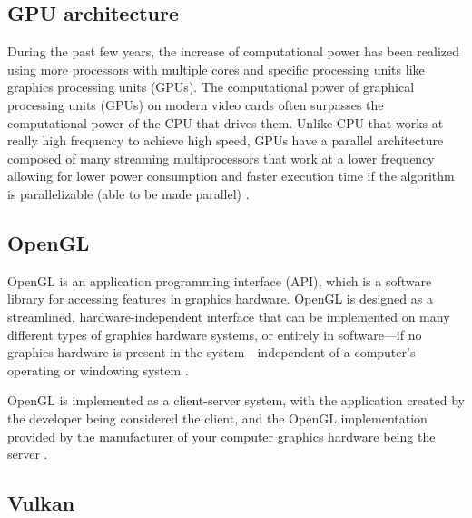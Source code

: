 \documentclass[a4paper, 12pt, oneside]{book}
\begin{document}
\subsection{GPU architecture}

\begin{doublespace}
    During the past few years, the increase of computational power has been realized using more processors with multiple cores and specific processing units like graphics processing units (GPUs). The computational power of graphical processing units (GPUs) on modern video cards often surpasses the computational power of the CPU that drives them. Unlike CPU that works at really high frequency to achieve high speed, GPUs have a parallel architecture composed of many streaming multiprocessors that work at a lower frequency allowing for lower power consumption and faster execution time if the algorithm is parallelizable (able to be made parallel) \cite[174]{cai2015}.
\end{doublespace}

\subsection{OpenGL}

\begin{doublespace}
    OpenGL is an application programming interface (API), which is a software library for accessing features in graphics hardware. OpenGL is designed as a streamlined, hardware-independent interface that can be implemented on many different types of graphics hardware systems, or entirely in software---if no graphics hardware is present in the system---independent of a computer's operating or windowing system \cite{kessenich2016}.
    
    OpenGL is implemented as a client-server system, with the application created by the developer being considered the client, and the OpenGL implementation provided by the manufacturer of your computer graphics hardware being the server \cite{kessenich2016}.
\end{doublespace}

\subsection{Vulkan}
\end{document}
